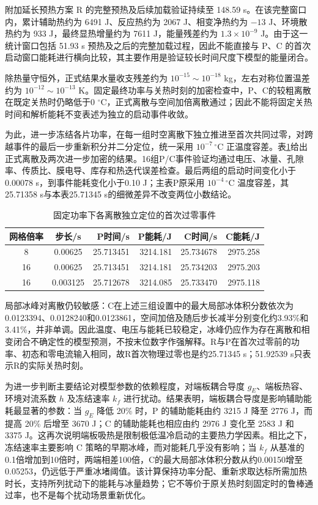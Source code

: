 \documentclass[bwprint]{gmcmthesis}
\numberwithin{equation}{section}
\numberwithin{figure}{section}
\begin{document}
附加延长预热方案 R 的完整预热及后续加载验证持续至 148.59 s。在该完整窗口内，累计辅助热约为 6491 J、反应热约为 2067 J、相变净热约为 \(-13\) J、环境散热约为 933 J，最终显热增量约为 7611 J，能量残差约为 \(1.3\times10^{-9}\) J。由于这一统计窗口包括 51.93 s 预热及之后的完整加载过程，因此不能直接与 P、C 的首次启动窗口能耗进行横向比较，其主要作用是验证较长时间尺度下模型的能量闭合。   

除热量守恒外，正式结果水量收支残差约为 \(10^{-15}\sim10^{-18}\) kg，左右对称位置温差约为 \(10^{-12}\sim10^{-13}\) K。固定最终功率与关热时刻的加密检查中，P、C的较粗离散在既定关热时仍略低于0 $^\circ\mathrm C$，正式离散与空间加倍离散通过；因此不能将固定关热时间和解析能耗不变表述为独立的启动事件收敛。

为此，进一步冻结各片功率，在每一组时空离散下独立推进至首次共同过零，对跨越事件的最后一步重新积分并二分定位，统一采用 \(10^{-7}\,^\circ\mathrm C\) 正温度容差。表\ref{tab:q3:event}给出正式离散及两次进一步加密的结果。16组P/C事件验证均通过电压、冰量、孔隙率、传质比、膜电导、库存和热迭代误差检查。最后两组的启动时间变化小于0.00078 s，到事件能耗变化小于0.10 J；主表P原采用 \(10^{-4}\,^\circ\mathrm C\) 温度容差，其25.71358 s与本表25.71345 s的细微差异不改变两位小数结论。

\begin{table}[htbp]
\centering
\caption{固定功率下各离散独立定位的首次过零事件}
\label{tab:q3:event}
\begin{tabular}{ccrrrr}
\toprule
网格倍率 & 步长/s & P时间/s & P能耗/J & C时间/s & C能耗/J\\
\midrule
8 & 0.00625 & 25.713451 & 3214.181 & 25.734678 & 2975.258\\
16 & 0.00625 & 25.713451 & 3214.181 & 25.734203 & 2975.203\\
16 & 0.003125 & 25.712678 & 3214.085 & 25.733470 & 2975.118\\
\bottomrule
\end{tabular}
\end{table}

局部冰峰对离散仍较敏感：C在上述三组设置中的最大局部冰体积分数依次为0.0123394、0.0128240和0.0123861，空间加倍及随后步长减半分别变化约3.93\%和3.41\%，并非单调。因此温度、电压与能耗已较稳定，冰峰仍应作为存在离散和相变闭合不确定性的模型预测，不按末位数字作强解释。R与P在首次过零前的功率、初态和零电流输入相同，故R首次物理过零也是约25.71345 s；51.92539 s只表示R的实际关热时刻。

为进一步判断主要结论对模型参数的依赖程度，对端板耦合导度 \(g_E\)、端板热容、环境对流系数 \(h\) 及冻结速率 \(k_f\) 进行扰动。结果表明，端板耦合导度是影响辅助能耗最显著的参数：当 \(g_E\) 降低 20\% 时，P 的辅助能耗由约 3215 J 降至 2776 J，而提高 20\% 后增至 3670 J；C 的辅助能耗也相应由约 2976 J 变化至 2583 J 和 3375 J。这再次说明端板吸热是限制极低温冷启动的主要热力学因素。相比之下，冻结速率主要影响 C 策略的早期冰峰，而对能耗几乎没有影响；当 \(k_f\) 从基准的0.1倍增加到10倍时，两端相差100倍，C的最大局部冰体积分数从约0.00150增至0.05253，仍远低于严重冰堵阈值。该计算保持功率分配、重新求取达标所需加热时长，支持所列扰动下的能耗与冰量趋势；它不等价于原关热时刻固定时的鲁棒通过率，也不是每个扰动场景重新优化。  
\end{document}
